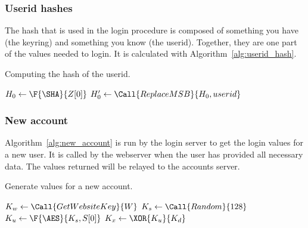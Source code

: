 \subsubsection{Userid hashes}
The hash that is used in the login procedure is composed of something you have
(the keyring)
and something you know
(the userid).
Together,
they are one part of the values needed to login.
It is calculated with Algorithm~\vref{alg:userid_hash}.
\begin{algorithm}
\caption{Computing the hash of the userid.}
\label{alg:userid_hash}
\begin{algorithmic}[1]
\State $H_0\gets\F{\SHA}{Z[0]}$
\State $H_0'\gets\Call{ReplaceMSB}{H_0,userid}$
\State {}
\EndProcedure
\end{algorithmic}
\end{algorithm}
\subsubsection{New account}
Algorithm~\vref{alg:new_account} is run by the login server to get the login values for a new user.
It is called by the webserver when the user has provided all necessary data.
The values returned will be relayed to the accounts server.
\begin{algorithm}
\caption{Generate values for a new account.}
\label{alg:new_account}
\begin{algorithmic}[1]
\State $K_w\gets\Call{GetWebsiteKey}{W}$	
\State $K_s\gets\Call{Random}{128}$
\State $K_u\gets\F{\AES}{K_s,S[0]}$ 
\State $K_x\gets\XOR{K_u}{K_d}$ 
\State {} 
\EndProcedure
\end{algorithmic}
\end{algorithm}
\par
